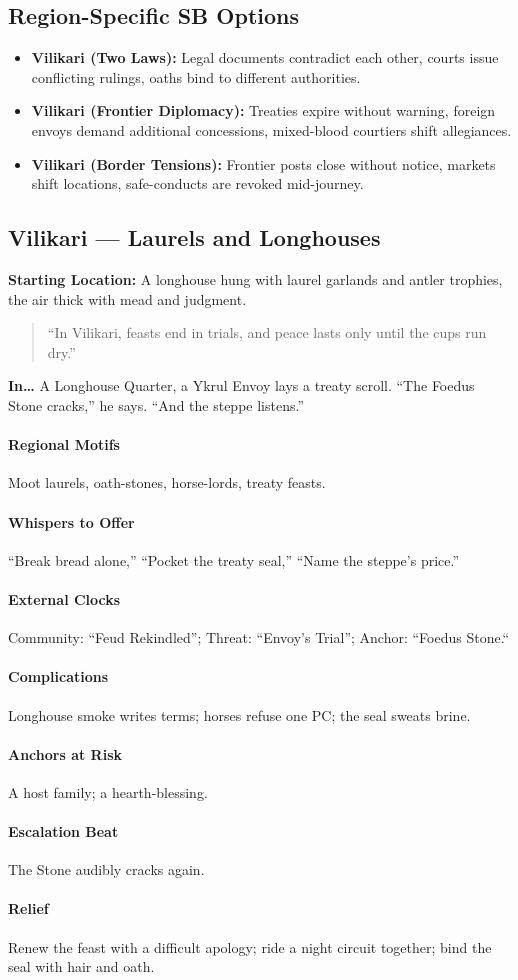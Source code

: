 \subsection*{Region-Specific SB Options}
\begin{itemize}
\item \textbf{Vilikari (Two Laws):} Legal documents contradict each other, courts issue conflicting rulings, oaths bind to different authorities.
\item \textbf{Vilikari (Frontier Diplomacy):} Treaties expire without warning, foreign envoys demand additional concessions, mixed-blood courtiers shift allegiances.
\item \textbf{Vilikari (Border Tensions):} Frontier posts close without notice, markets shift locations, safe-conducts are revoked mid-journey.
\end{itemize}


\subsection*{Vilikari — Laurels and Longhouses}
\textbf{Starting Location:} A longhouse hung with laurel garlands and antler trophies, the air thick with mead and judgment.
\begin{quote}
“In Vilikari, feasts end in trials, and peace lasts only until the cups run dry.”
\end{quote}

\textbf{In…} A Longhouse Quarter, a Ykrul Envoy lays a treaty scroll. ``The Foedus Stone cracks,'' he says. ``And the steppe listens.''
\paragraph{Regional Motifs} Moot laurels, oath-stones, horse-lords, treaty feasts.
\paragraph{Whispers to Offer} ``Break bread alone,'' ``Pocket the treaty seal,'' ``Name the steppe’s price.''
\paragraph{External Clocks} Community: ``Feud Rekindled''; Threat: ``Envoy’s Trial''; Anchor: ``Foedus Stone.``
\paragraph{Complications} Longhouse smoke writes terms; horses refuse one PC; the seal sweats brine.
\paragraph{Anchors at Risk} A host family; a hearth-blessing.
\paragraph{Escalation Beat} The Stone audibly cracks again.
\paragraph{Relief} Renew the feast with a difficult apology; ride a night circuit together; bind the seal with hair and oath.
